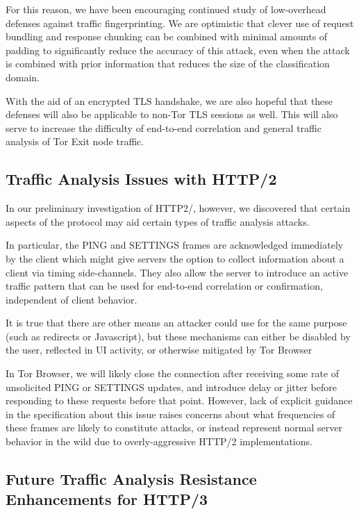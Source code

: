 \documentclass[letterpaper,11pt]{llncs}
\begin{document}
For this reason, we have been encouraging continued study of low-overhead
defenses against traffic fingerprinting. We are optimistic that clever use of
request bundling and response chunking can be combined with minimal amounts of
padding to significantly reduce the accuracy of this attack, even when the
attack is combined with prior information that reduces the size of the
classification domain.

With the aid of an encrypted TLS handshake, we are also hopeful that these
defenses will also be applicable to non-Tor TLS sessions as well. This will
also serve to increase the difficulty of end-to-end correlation and general
traffic analysis of Tor Exit node traffic.


\subsection{Traffic Analysis Issues with HTTP/2}

In our preliminary investigation of HTTP2/, however, we discovered that
certain aspects of the protocol may aid certain types of traffic analysis
attacks.

In particular, the PING and SETTINGS frames are acknowledged immediately by
the client which might give servers the option to collect information about a
client via timing side-channels. They also allow the server to introduce an
active traffic pattern that can be used for end-to-end correlation or
confirmation, independent of client behavior.

It is true that there are other means an attacker could use for the same
purpose (such as redirects or Javascript), but these mechanisms can either be
disabled by the user, reflected in UI activity, or otherwise mitigated by Tor
Browser

In Tor Browser, we will likely close the connection after receiving some rate
of unsolicited PING or SETTINGS updates, and introduce delay or jitter before
responding to these requests before that point. However, lack of explicit
guidance in the specification about this issue raises concerns about what
frequencies of these frames are likely to constitute attacks, or instead
represent normal server behavior in the wild due to overly-aggressive HTTP/2
implementations.

\subsection{Future Traffic Analysis Resistance Enhancements for HTTP/3}
\end{document}
